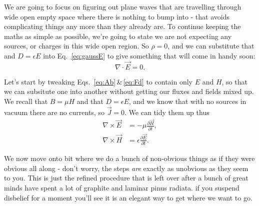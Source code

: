\documentclass{tufte-handout}
\begin{document}
We are going to focus on figuring out plane waves that are travelling through wide open empty space where there is nothing to bump into - that avoids complicating things any more than they already are. To continue keeping the maths as simple as possible, we're going to state we are not expecting any sources, or charges in this wide open region. So $\rho=0$, and we can substitute that and $D=\epsilon{}E$ into Eq.~\ref{eq:gaussE} to give something that will come in handy soon:
\begin{equation}
\nabla\cdot\vec{E} = 0. \label{eq:gaussE0}
\end{equation}

Let's start by tweaking Eqs.~\ref{eq:Ab}\,\&\,\ref{eq:Fd} to contain only $E$ and $H$, so that we can subsitute one into another without getting our fluxes and fields mixed up. We recall that $B=\mu{}H$ and that $D=\epsilon{}E$, and we know that with no sources in vacuum there are no currents, so $\vec{J}=0$. We can tidy them up thus
\begin{align}
\nabla\times\vec{E} & = -\mu\frac{\partial\vec{H}}{\partial t}, \label{eq:curlE}\\
\nabla\times\vec{H} & = \epsilon\frac{\partial\vec{E}}{\partial t}. \label{eq:curlH} 
\end{align}

We now move onto bit where we do a bunch of non-obvious things as if they were obvious all along - don't worry, the steps \emph{are} exactly as unobvious as they seem to you. This is just the refined procedure that is left over after a bunch of great minds have spent a lot of graphite and laminar pinus radiata. if you suspend disbelief for a moment you'll see it is an elegant way to get where we want to go.
\end{document}
